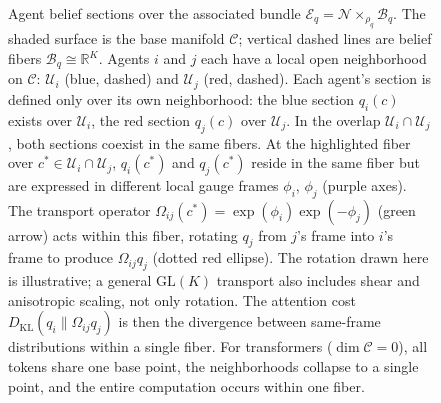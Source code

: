 \documentclass[twoside,11pt]{article}
\newcommand{\KL}{\operatorname{KL}}
\begin{document}
\begin{figure}[t]
\caption{%
Agent belief sections over the associated bundle
$\mathcal{E}_q = \mathcal{N} \times_{\rho_q} \mathcal{B}_q$.
The shaded surface is the base manifold $\mathcal{C}$;
vertical dashed lines are belief fibers $\mathcal{B}_q \cong \mathbb{R}^K$.
Agents $i$ and $j$ each have a local open neighborhood on $\mathcal{C}$:
$\mathcal{U}_i$ (blue, dashed) and $\mathcal{U}_j$ (red, dashed).
Each agent's section is defined only over its own neighborhood:
the blue section $q_i(c)$ exists over $\mathcal{U}_i$,
the red section $q_j(c)$ over $\mathcal{U}_j$.
In the overlap $\mathcal{U}_i \cap \mathcal{U}_j$,
both sections coexist in the same fibers.
At the highlighted fiber over $c^* \in \mathcal{U}_i \cap \mathcal{U}_j$,
$q_i(c^*)$ and $q_j(c^*)$ reside in the same fiber
but are expressed in different local gauge frames
$\phi_i$, $\phi_j$ (purple axes).
The transport operator
$\Omega_{ij}(c^*) = \exp(\phi_i)\exp(-\phi_j)$
(green arrow) acts within this fiber,
rotating $q_j$ from $j$'s frame into $i$'s frame
to produce $\Omega_{ij} q_j$ (dotted red ellipse).
The rotation drawn here is illustrative; a general $\mathrm{GL}(K)$ transport also includes shear and anisotropic scaling, not only rotation.
The attention cost $D_{\mathrm{KL}}(q_i \| \Omega_{ij} q_j)$
is then the divergence between same-frame distributions within a single fiber.
For transformers ($\dim\mathcal{C} = 0$),
all tokens share one base point, the neighborhoods collapse to a single point,
and the entire computation occurs within one fiber.
}
\label{fig:bundle_sections_surface}
\end{figure}
\end{document}
